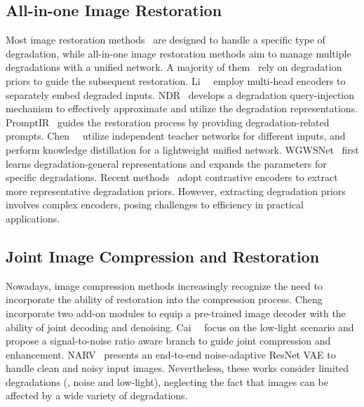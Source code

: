  \vspace{-0.05in}\subsection{All-in-one Image Restoration} \vspace{-0.05in}
Most image restoration methods~\cite{xiong2010robust,swinir,restormer,uformer,chen2023learning,li2023efficient,li2024toward,Li_2024_CVPR} are designed to handle a specific type of degradation, while all-in-one image restoration methods aim to manage multiple degradations with a unified network.  A majority of them~\cite{valanarasu2022transweather,li2020all,airnet, park2023all,yao2024neural} rely on degradation priors to guide the subsequent restoration.  Li~\etal~\cite{li2020all} employ multi-head encoders to separately embed degraded inputs. NDR~\cite{yao2024neural} develops a degradation query-injection mechanism to effectively approximate and utilize the degradation representations. PromptIR~\cite{potlapalli2023promptir} guides the restoration process by providing degradation-related prompts. Chen~\etal~\cite{chen2022learning} utilize independent teacher networks for different inputs, and perform knowledge distillation for a lightweight unified network.  WGWSNet~\cite{wgwsnet} first learns degradation-general representations and expands the parameters for specific degradations.  Recent methods~\cite{airnet, park2023all} adopt contrastive encoders to extract more representative degradation priors.  However, extracting degradation priors involves complex encoders, posing challenges to efficiency in practical applications. 
 
 
 \vspace{-0.05in}\subsection{Joint Image Compression and Restoration} \vspace{-0.05in}
Nowadays, image compression methods increasingly recognize the need to incorporate the ability of restoration into the compression process. 
Cheng~\etal~\cite{denoise_chen} incorporate two add-on modules to equip a pre-trained image decoder with the ability of joint decoding and denoising. Cai~\etal~\cite{cai2024make} focus on the low-light scenario and propose a signal-to-noise ratio aware branch to guide joint compression and enhancement.  NARV~\cite{huang2023narv} presents an end-to-end noise-adaptive ResNet VAE to handle clean and noisy input images. Nevertheless, these works consider limited degradations (\eg, noise and low-light), neglecting the fact that images can be affected by a wide variety of degradations.
 

